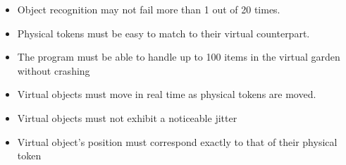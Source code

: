 \begin{itemize}
						\item Object recognition may not fail more than 1 out of 20 times.
						\item Physical tokens must be easy to match to their virtual counterpart.
						\item The program must be able to handle up to 100 items in the virtual garden without crashing
						
						\item Virtual objects must move in real time as physical tokens are moved.
						\item Virtual objects must not exhibit a noticeable jitter
						\item Virtual object's position must correspond exactly to that of their physical token
					\end{itemize}
			